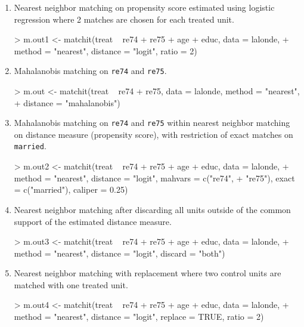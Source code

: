\documentclass[oneside,letterpaper,titlepage]{article}
\begin{document}
\begin{enumerate}

\item Nearest neighbor matching on propensity score estimated using
  logistic regression where 2 matches are chosen for each treated unit.
\begin{Schunk}
\begin{Sinput}
> m.out1 <- matchit(treat ~ re74 + re75 + age + educ, data = lalonde, 
+     method = "nearest", distance = "logit", ratio = 2)
\end{Sinput}
\end{Schunk}

\item Mahalanobis matching on {\tt re74} and {\tt re75}.
\begin{Schunk}
\begin{Sinput}
> m.out <- matchit(treat ~ re74 + re75, data = lalonde, method = "nearest", 
+     distance = "mahalanobis")
\end{Sinput}
\end{Schunk}

\item Mahalanobis matching on {\tt re74} and {\tt re75} within nearest
  neighbor matching on distance measure (propensity score), with restriction of exact
  matches on {\tt married}.
\begin{Schunk}
\begin{Sinput}
> m.out2 <- matchit(treat ~ re74 + re75 + age + educ, data = lalonde, 
+     method = "nearest", distance = "logit", mahvars = c("re74", 
+         "re75"), exact = c("married"), caliper = 0.25)
\end{Sinput}
\end{Schunk}

\item Nearest neighbor matching after discarding all units outside of
  the common support of the estimated distance measure.
\begin{Schunk}
\begin{Sinput}
> m.out3 <- matchit(treat ~ re74 + re75 + age + educ, data = lalonde, 
+     method = "nearest", distance = "logit", discard = "both")
\end{Sinput}
\end{Schunk}

\item Nearest neighbor matching with replacement where two control
  units are matched with one treated unit.
\begin{Schunk}
\begin{Sinput}
> m.out4 <- matchit(treat ~ re74 + re75 + age + educ, data = lalonde, 
+     method = "nearest", distance = "logit", replace = TRUE, ratio = 2)
\end{Sinput}
\end{Schunk}


\end{enumerate}
\end{document}
